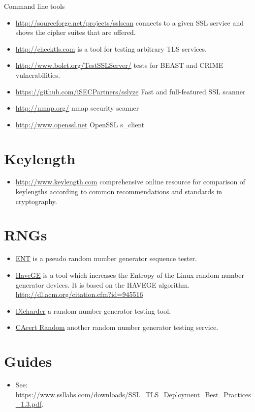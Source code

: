 Command line tools
\begin{itemize}
\item \url{http://sourceforge.net/projects/sslscan} connects to a given SSL service and shows the cipher suites that are offered.
\item \url{http://checktls.com} is a tool for testing arbitrary TLS services. 
\item \url{http://www.bolet.org/TestSSLServer/} tests for BEAST and CRIME vulnerabilities.
\item \url{https://github.com/iSECPartners/sslyze} Fast and full-featured SSL scanner
\item \url{http://nmap.org/} nmap security scanner
\item \url{http://www.openssl.net} OpenSSL s\_client
\end{itemize}


\section{Keylength}
\begin{itemize}
\item \url{http://www.keylength.com} comprehensive online resource for comparison of keylengths according to common recommendations and standards in cryptography.
\end{itemize}


\section{RNGs}

\begin{itemize}
\item \href{http://www.fourmilab.ch/random/}{ENT} is a pseudo random number generator sequence tester.
\item \href{http://www.issihosts.com/haveged/}{HaveGE} is a tool which increases the Entropy of the Linux random number generator devices. It is based on the HAVEGE algorithm. \url{http://dl.acm.org/citation.cfm?id=945516}
\item \href{http://www.phy.duke.edu/~rgb/General/dieharder.php}{Dieharder} a random number generator testing tool.
\item \href{http://www.cacert.at/random/}{CAcert Random} another random number generator testing service.
\end{itemize}

\section{Guides}
\begin{itemize}
\item See: \url{https://www.ssllabs.com/downloads/SSL_TLS_Deployment_Best_Practices_1.3.pdf}.
\end{itemize}
